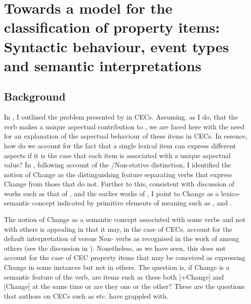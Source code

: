 \chapter[Syntactic behaviour, event types and semantic interpretations]{Towards a model for the classification of property items:
Syntactic behaviour, event types and semantic interpretations}
 \label{sec:5}\label{ch:5}

\section{Background}\label{sec:5.0}

In , I outlined the problem presented by  in CECs. Assuming, as I do, that the verb makes a unique aspectual contribution to , we are faced here with the need for an explanation of the aspectual behaviour of these items in CECs. In essence, how do we account for the fact that a single lexical item can express different aspects if it is the case that each item is associated with a unique aspectual value? In , following  account of the \slash Non-stative distinction, I identified the notion of Change as the distinguishing feature separating verbs that express Change from those that do not. Further to this, consistent with discussion of works such as that of \citet{Levin1993}, and the earlier works of \citet{McCawley1968,Carter1976,Dowty1979,Pustejovsky1988,Grimshaw1990}, I point to Change as a lexico-semantic concept indicated by primitive elements of meaning such as \BECOME, \CAUSE and \DO. 

The notion of Change as a semantic concept associated with some verbs and not with others is appealing in that it may, in the case of CECs, account for the default  interpretation of  versus Non- verbs as recognised in the work of \citet{Bickerton1975,Winford1993,Gooden2008} among others (see the discussion in ). Nonetheless, as we have seen, this does not account for the case of CEC property items that may be conceived as expressing Change in some instances but not in others. The question is, if Change is a semantic feature of the verb, are items such as these both [+Change] and [\textminus Change] at the same time or are they one or the other? These are the questions that authors on CECs such as \citet{Bickerton1975,Jaganauth1987,Winford1993,Sidnell2002,} etc. have grappled with.\largerpage[-1] 

